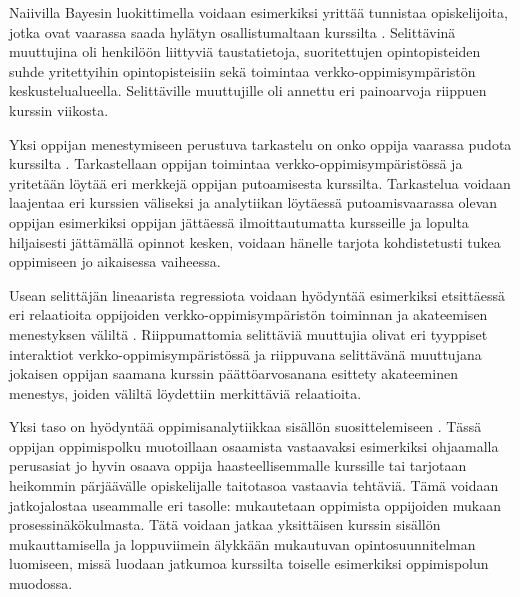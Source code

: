Naiivilla Bayesin luokittimella voidaan esimerkiksi yrittää tunnistaa opiskelijoita, jotka ovat vaarassa saada hylätyn osallistumaltaan kurssilta \citep{barberCourseCorrectionUsing2012}. Selittävinä muuttujina oli henkilöön liittyviä taustatietoja, suoritettujen opintopisteiden suhde yritettyihin opintopisteisiin sekä toimintaa verkko-oppimisympäristön keskustelualueella. Selittäville muuttujille oli annettu eri painoarvoja riippuen kurssin viikosta.

Yksi oppijan menestymiseen perustuva tarkastelu on onko oppija vaarassa pudota kurssilta \citep{oliveSupervisedLearningFramework2018, suhonenUsingMoodleData2019}. Tarkastellaan oppijan toimintaa verkko-oppimisympäristössä ja yritetään löytää eri merkkejä oppijan putoamisesta kurssilta. Tarkastelua voidaan laajentaa eri kurssien väliseksi \citep{kinnari-korpelaOppimisanalytiikallaTehokkaampaanOhjaukseen2020} ja analytiikan löytäessä putoamisvaarassa olevan oppijan esimerkiksi oppijan jättäessä ilmoittautumatta kursseille ja lopulta hiljaisesti jättämällä opinnot kesken, voidaan hänelle tarjota kohdistetusti tukea oppimiseen jo aikaisessa vaiheessa.

Usean selittäjän lineaarista regressiota voidaan hyödyntää esimerkiksi etsittäessä eri relaatioita oppijoiden verkko-oppimisympäristön toiminnan ja akateemisen menestyksen väliltä \citep{agudo-peregrinaCanWePredict2014}. Riippumattomia selittäviä muuttujia olivat eri tyyppiset interaktiot verkko-oppimisympäristössä ja riippuvana selittävänä muuttujana jokaisen oppijan saamana kurssin päättöarvosanana esittety akateeminen menestys, joiden väliltä löydettiin merkittäviä relaatioita.


Yksi taso on hyödyntää oppimisanalytiikkaa sisällön suosittelemiseen \citep{longPenetratingFogAnalytics2011,siemensLearningAnalyticsEmergence2013}. Tässä oppijan oppimispolku muotoillaan osaamista vastaavaksi esimerkiksi ohjaamalla perusasiat jo hyvin osaava oppija haasteellisemmalle kurssille tai tarjotaan heikommin pärjäävälle opiskelijalle taitotasoa vastaavia tehtäviä. Tämä voidaan jatkojalostaa useammalle eri tasolle: mukautetaan oppimista oppijoiden mukaan prosessinäkökulmasta. Tätä voidaan jatkaa yksittäisen kurssin sisällön mukauttamisella ja loppuviimein älykkään mukautuvan opintosuunnitelman luomiseen, missä luodaan jatkumoa kurssilta toiselle esimerkiksi oppimispolun muodossa.

